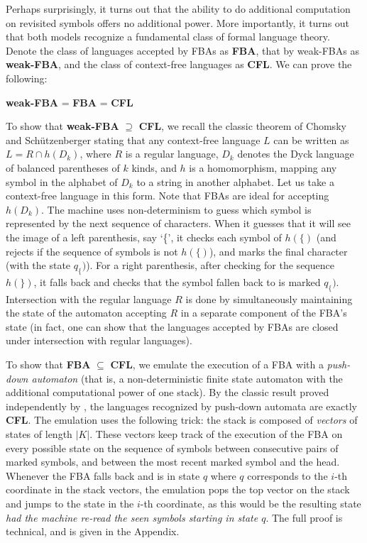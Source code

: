 \documentclass[11pt]{article}
\begin{document}
Perhaps surprisingly, it turns out that the ability to do additional computation on revisited symbols offers no additional power. More importantly, it turns out that both models recognize a fundamental class of formal language theory. Denote the class of languages accepted by FBAs as {\bf FBA}, that by weak-FBAs as {\bf weak-FBA}, and the class of context-free languages as {\bf CFL}.
We can prove the following:

\medskip{} {\bf weak-FBA} = {\bf FBA} = {\bf CFL}

\medskip{} To show that {\bf weak-FBA} $\supseteq$ {\bf CFL}, we recall the classic theorem of Chomsky and Sch\"utzenberger \cite{chomsky_shutz} stating that any context-free language $L$ can be written as $L= R \cap h(D_k)$, where $R$ is a regular language, $D_k$ denotes the Dyck language of balanced parentheses of $k$ kinds, and $h$ is a homomorphism, mapping any symbol in the alphabet of $D_k$ to a string in another alphabet. Let us take a context-free language in this form.  Note that FBAs are ideal for accepting $h(D_k)$. The machine uses non-determinism to guess which symbol is represented by the next sequence of characters. When it guesses that it will see the image of a left parenthesis, say `\{', it checks each symbol of $h(\{)$ (and rejects if the sequence of symbols is not $h(\{)$), and marks the final character (with the state $q_{\{})$). For a right parenthesis, after checking for the sequence $h(\})$, it falls back and checks that the symbol fallen back to is marked $q_{\{})$. Intersection with the regular language $R$ is done by simultaneously maintaining the state of the automaton accepting $R$ in a separate component of the FBA's state (in fact, one can show that the languages accepted by FBAs are closed under intersection with regular languages).

To show that {\bf FBA} $\subseteq$ {\bf CFL}, we emulate the execution of a FBA with a {\em push-down automaton} (that is, a non-deterministic finite state automaton with the additional computational power of one stack). By the classic result proved independently by \citet{ChomskyCFG, SchutzenbergerCFG, Evey}, the languages recognized by push-down automata are exactly {\bf CFL}. The emulation uses the following trick: the stack is composed of {\em vectors} of states of length $|K|$. These vectors keep track of the execution of the FBA on every possible state on the sequence of symbols between consecutive pairs of marked symbols, and between the most recent marked symbol and the head. Whenever the FBA falls back and is in state $q$ where $q$ corresponds to the $i$-th coordinate in the stack vectors, the emulation pops the top vector on the stack and jumps to the state in the $i$-th coordinate, as this would be the resulting state {\em had the machine re-read the seen symbols starting in state $q$}. The full proof is technical, and is given in the Appendix.
\end{document}
